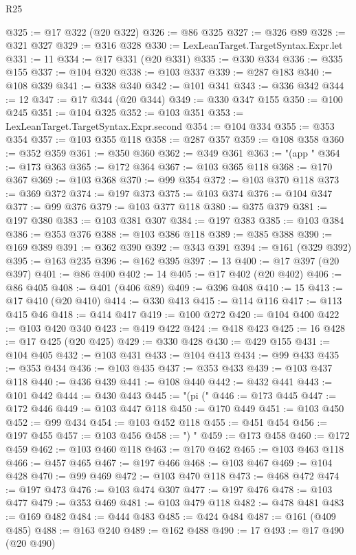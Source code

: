 \begin{lexlean}{R25}
\begin{coremodule}
@325 := @17 @322 (@20 @322)
@326 := @86 @325
@327 := @326 @89
@328 := @321 @327
@329 := @316 @328
@330 := LexLeanTarget.TargetSyntax.Expr.let
@331 := 11
@334 := @17 @331 (@20 @331)
@335 := @330 @334
@336 := @335 @155
@337 := @104 @320
@338 := @103 @337
@339 := @287 @183
@340 := @108 @339
@341 := @338 @340
@342 := @101 @341
@343 := @336 @342
@344 := 12
@347 := @17 @344 (@20 @344)
@349 := @330 @347 @155
@350 := @100 @245
@351 := @104 @325
@352 := @103 @351
@353 := LexLeanTarget.TargetSyntax.Expr.second
@354 := @104 @334
@355 := @353 @354
@357 := @103 @355 @118
@358 := @287 @357
@359 := @108 @358
@360 := @352 @359
@361 := @350 @360
@362 := @349 @361
@363 := "(app "
@364 := @173 @363
@365 := @172 @364
@367 := @103 @365 @118
@368 := @170 @367
@369 := @103 @368
@370 := @99 @354
@372 := @103 @370 @118
@373 := @369 @372
@374 := @197 @373
@375 := @103 @374
@376 := @104 @347
@377 := @99 @376
@379 := @103 @377 @118
@380 := @375 @379
@381 := @197 @380
@383 := @103 @381 @307
@384 := @197 @383
@385 := @103 @384
@386 := @353 @376
@388 := @103 @386 @118
@389 := @385 @388
@390 := @169 @389
@391 := @362 @390
@392 := @343 @391
@394 := @161 (@329 @392)
@395 := @163 @235
@396 := @162 @395
@397 := 13
@400 := @17 @397 (@20 @397)
@401 := @86 @400
@402 := 14
@405 := @17 @402 (@20 @402)
@406 := @86 @405
@408 := @401 (@406 @89)
@409 := @396 @408
@410 := 15
@413 := @17 @410 (@20 @410)
@414 := @330 @413
@415 := @114 @116
@417 := @113 @415 @46
@418 := @414 @417
@419 := @100 @272
@420 := @104 @400
@422 := @103 @420 @340
@423 := @419 @422
@424 := @418 @423
@425 := 16
@428 := @17 @425 (@20 @425)
@429 := @330 @428
@430 := @429 @155
@431 := @104 @405
@432 := @103 @431
@433 := @104 @413
@434 := @99 @433
@435 := @353 @434
@436 := @103 @435
@437 := @353 @433
@439 := @103 @437 @118
@440 := @436 @439
@441 := @108 @440
@442 := @432 @441
@443 := @101 @442
@444 := @430 @443
@445 := "(pi ("
@446 := @173 @445
@447 := @172 @446
@449 := @103 @447 @118
@450 := @170 @449
@451 := @103 @450
@452 := @99 @434
@454 := @103 @452 @118
@455 := @451 @454
@456 := @197 @455
@457 := @103 @456
@458 := ") "
@459 := @173 @458
@460 := @172 @459
@462 := @103 @460 @118
@463 := @170 @462
@465 := @103 @463 @118
@466 := @457 @465
@467 := @197 @466
@468 := @103 @467
@469 := @104 @428
@470 := @99 @469
@472 := @103 @470 @118
@473 := @468 @472
@474 := @197 @473
@476 := @103 @474 @307
@477 := @197 @476
@478 := @103 @477
@479 := @353 @469
@481 := @103 @479 @118
@482 := @478 @481
@483 := @169 @482
@484 := @444 @483
@485 := @424 @484
@487 := @161 (@409 @485)
@488 := @163 @240
@489 := @162 @488
@490 := 17
@493 := @17 @490 (@20 @490)

\end{coremodule}
\end{lexlean}
